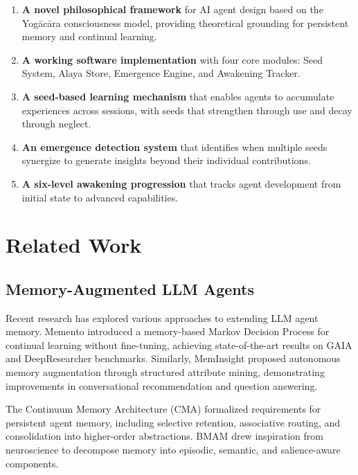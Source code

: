 \documentclass[11pt, a4paper]{article}
\begin{document}
\begin{enumerate}
    \item \textbf{A novel philosophical framework} for AI agent design based on the Yogācāra consciousness model, providing theoretical grounding for persistent memory and continual learning.
    
    \item \textbf{A working software implementation} with four core modules: Seed System, Alaya Store, Emergence Engine, and Awakening Tracker.
    
    \item \textbf{A seed-based learning mechanism} that enables agents to accumulate experiences across sessions, with seeds that strengthen through use and decay through neglect.
    
    \item \textbf{An emergence detection system} that identifies when multiple seeds synergize to generate insights beyond their individual contributions.
    
    \item \textbf{A six-level awakening progression} that tracks agent development from initial state to advanced capabilities.
\end{enumerate}

\section{Related Work}

\subsection{Memory-Augmented LLM Agents}

Recent research has explored various approaches to extending LLM agent memory. Memento \cite{Zhang2025} introduced a memory-based Markov Decision Process for continual learning without fine-tuning, achieving state-of-the-art results on GAIA and DeepResearcher benchmarks. Similarly, MemInsight \cite{AmazonScience2025} proposed autonomous memory augmentation through structured attribute mining, demonstrating improvements in conversational recommendation and question answering.

The Continuum Memory Architecture (CMA) \cite{CMA2025} formalized requirements for persistent agent memory, including selective retention, associative routing, and consolidation into higher-order abstractions. BMAM \cite{BMAM2026} drew inspiration from neuroscience to decompose memory into episodic, semantic, and salience-aware components.
\end{document}
